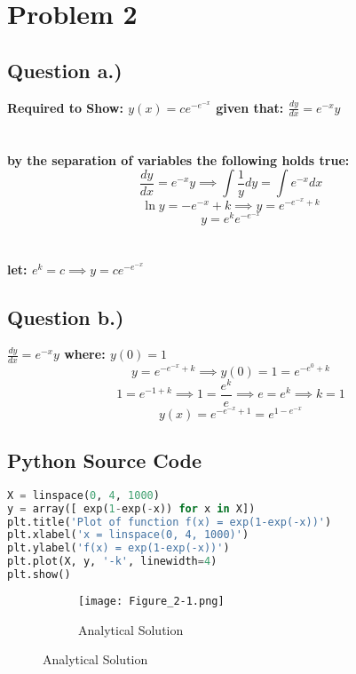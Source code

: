 \documentclass{article}
\begin{document}
\section*{Problem 2}
\subsection*{Question a.)}
\begin{center}
\textbf{Required to Show: $y(x) = ce^{-e^{-x}}$ given that: $\frac{dy}{dx} = e^{-x}y$ \\} \textbf{\\ \\by the separation of variables the following holds true: }
\[\frac{dy}{dx} = e^{-x}y \implies \int \frac{1}{y}dy = \int e^{-x}dx\]
\[ \ln{y} = -e^{-x} + k \implies y = e^{-e^{-x} + k}\]
\[y = e^ke^{-e^{-x}}\]
\\ \\ \textbf{let: $e^k = c \implies y = ce^{-e^{-x}}$}
\end{center}

\subsection*{Question b.)}
\begin{center}
\textbf{$\frac{dy}{dx} = e^{-x}y$ where: $y(0) = 1$} 
\[y = e^{-e^{-x} + k} \implies y(0) = 1 = e^{-e^{0} + k} \]
\[1 = e^{-1 + k} \implies 1 = \frac{e^{k}}{e} \implies e = e^k \implies k = 1\]
\[y(x) = e^{-e^{-x} + 1} = e^{1 -e^{-x}}\]

\subsection*{Python Source Code}
\begin{lstlisting}[language=Python]
X = linspace(0, 4, 1000)
y = array([ exp(1-exp(-x)) for x in X])
plt.title('Plot of function f(x) = exp(1-exp(-x))')
plt.xlabel('x = linspace(0, 4, 1000)')
plt.ylabel('f(x) = exp(1-exp(-x))')
plt.plot(X, y, '-k', linewidth=4)
plt.show()
\end{lstlisting}
\pagebreak
\begin{figure}[h!]
  \centering
  \begin{subfigure}{\linewidth}
    \texttt{[image: Figure\_2-1.png]}
    \caption{Analytical Solution}
  \end{subfigure}
\end{figure}
\end{center}
\pagebreak
\end{document}
